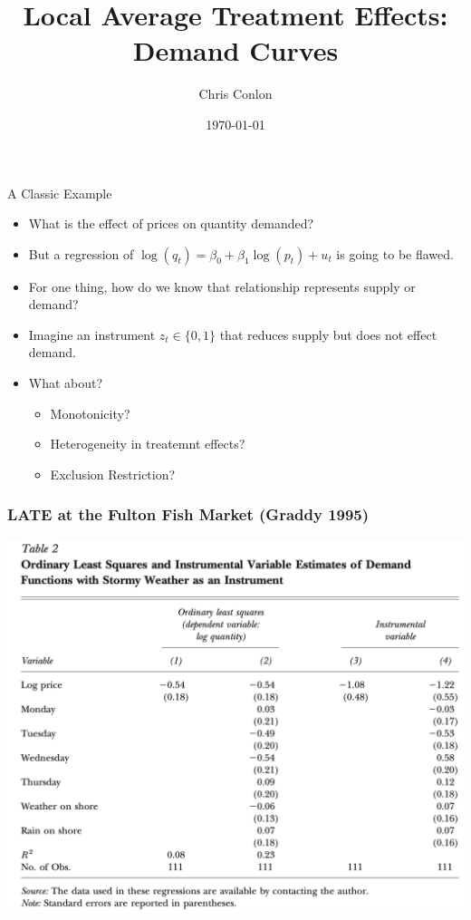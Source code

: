 \documentclass[xcolor=pdftex,dvipsnames,table,mathserif,aspectratio=169]{beamer}
\begin{document}
\title{Local Average Treatment Effects: Demand Curves}
\author{Chris Conlon}
\date{\today}

\frame{\titlepage}




\begin{frame}{A Classic Example}
\begin{itemize}
\item What is the effect of prices on quantity demanded?
\item But a regression of $\log(q_t)  = \beta_0 + \beta_1 \log(p_t) + u_t$ is going to be flawed.
\item For one thing, how do we know that relationship represents supply or demand?
\item Imagine an instrument $z_t \in \{0,1\}$ that reduces supply but does not effect demand.
\item What about?
\begin{itemize}
\item Monotonicity?
\item Heterogeneity in treatemnt effects?
\item Exclusion Restriction?
\end{itemize}
\end{itemize}
\end{frame}


\begin{frame}
\frametitle{LATE at the Fulton Fish Market (Graddy 1995)}
\begin{center}
\includegraphics[width=\textheight]{./resources/graddy}
\end{center}
\end{frame}
\end{document}
